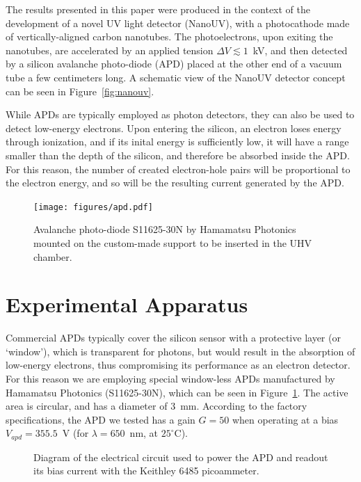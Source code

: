 \documentclass[12p]{paper}
\begin{document}
The results presented in this paper were produced in the context of the development of a novel UV light detector (NanoUV), with a photocathode made of vertically-aligned carbon nanotubes. The photoelectrons, upon exiting the nanotubes, are accelerated by an applied tension $\Delta V \lesssim 1$~kV, and then detected by a silicon avalanche photo-diode (APD) placed at the other end of a vacuum tube a few centimeters long. A schematic view of the NanoUV detector concept can be seen in Figure~\ref{fig:nanouv}. 

While APDs are typically employed as photon detectors, they can also be used to detect low-energy electrons. 
Upon entering the silicon, an electron loses energy through ionization, and if its inital energy is sufficiently low, it will have a range smaller than the depth of the silicon, and therefore be absorbed inside the APD. For this reason, the number of created electron-hole pairs will be proportional to the electron energy, and so will be the resulting current generated by the APD.

\begin{figure}[htb]
  \centering
  \texttt{[image: figures/apd.pdf]}
 \caption{Avalanche photo-diode S11625-30N by Hamamatsu Photonics mounted on the custom-made support to be inserted in the UHV chamber.
  \label{fig:apd}}
\end{figure}


\section{Experimental Apparatus}

Commercial APDs typically cover the silicon sensor with a protective layer (or `window'), which is transparent for photons, but would result in the absorption of low-energy electrons, thus compromising its performance as an electron detector. For this reason we are employing special window-less APDs manufactured by Hamamatsu Photonics (S11625-30N), which can be seen in Figure~\ref{fig:apd}. The active area is circular, and has a diameter of 3~mm. According to the factory specifications, the APD we tested has a gain $G = 50$ when operating at a bias $V_{apd} = 355.5$~V (for $\lambda = 650$~nm, at $25^{\circ}$C).


\begin{figure}[tb]
  \centering
 \caption{Diagram of the electrical circuit used to power the APD and readout its bias current with the Keithley 6485 picoammeter.
  \label{fig:schema}}
\end{figure}
\end{document}
